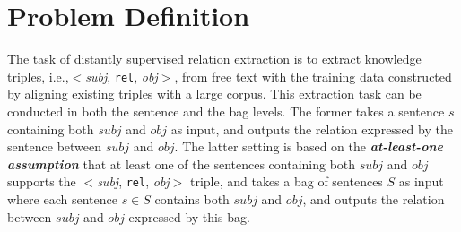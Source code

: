 \section{Problem Definition}
The task of distantly supervised relation extraction is to extract knowledge triples, i.e.,$<$\emph{subj}, \texttt{rel}, \emph{obj}$>$, from free text with the training data constructed by aligning existing \KB triples with a large corpus.
This extraction task can be conducted in both the sentence and the bag levels.
The former  takes a sentence $s$ containing both $subj$ and $obj$ as input, and outputs the relation expressed
by the sentence between $subj$ and $obj$. 
The latter setting is based on the \textit{\textbf{at-least-one assumption}} 
that at least one of the sentences containing both $subj$ and $obj$ supports the $<$\emph{subj}, \texttt{rel}, \emph{obj}$>$ triple,
and takes a bag of sentences $S$ as input where each sentence
$s\in S$ contains both $subj$ and
$obj$, and outputs  the relation between $subj$ and $obj$ expressed by this bag.

%
%
%
%








